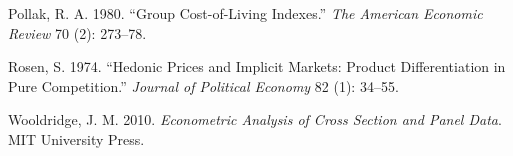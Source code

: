 \documentclass[]{article}
\begin{document}
\leavevmode\hypertarget{ref-pollak1980}{}%
Pollak, R. A. 1980. ``Group Cost-of-Living Indexes.'' \emph{The American Economic Review} 70 (2): 273--78.

\leavevmode\hypertarget{ref-rosen1974}{}%
Rosen, S. 1974. ``Hedonic Prices and Implicit Markets: Product Differentiation in Pure Competition.'' \emph{Journal of Political Economy} 82 (1): 34--55.

\leavevmode\hypertarget{ref-wooldridge2010}{}%
Wooldridge, J. M. 2010. \emph{Econometric Analysis of Cross Section and Panel Data}. MIT University Press.
\end{document}
